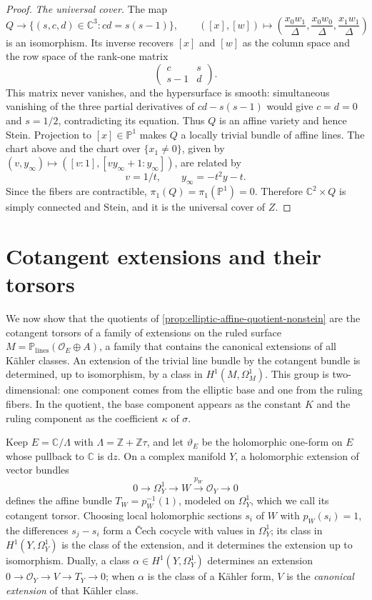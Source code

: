\begin{proof}
\emph{The universal cover.} The map
\[
 Q\longrightarrow\{(s,c,d)\in\mathbb C^3:cd=s(s-1)\},
 \qquad ([x],[w])\longmapsto
 \left(\frac{x_0w_1}{\Delta},\frac{x_0w_0}{\Delta},\frac{x_1w_1}{\Delta}\right)
\]
is an isomorphism. Its inverse recovers $[x]$ and $[w]$ as the column space and the row space of the rank-one matrix
\[
 \begin{pmatrix}c&s\\s-1&d\end{pmatrix}.
\]
This matrix never vanishes, and the hypersurface is smooth: simultaneous vanishing of the three partial derivatives of $cd-s(s-1)$ would give $c=d=0$ and $s=1/2$, contradicting its equation. Thus $Q$ is an affine variety and hence Stein. Projection to $[x]\in\mathbb P^1$ makes $Q$ a locally trivial bundle of affine lines. The chart above and the chart over $\{x_1\ne0\}$, given by $(v,y_\infty)\mapsto([v:1],[vy_\infty+1:y_\infty])$, are related by
\[
 v=1/t,\qquad y_\infty=-t^2y-t.
\]
Since the fibers are contractible, $\pi_1(Q)=\pi_1(\mathbb P^1)=0$. Therefore $\mathbb C^2\times Q$ is simply connected and Stein, and it is the universal cover of $Z$.
\end{proof}

\section{Cotangent extensions and their torsors}
\label{subsec:elliptic-cotangent-torsor-classes}

We now show that the quotients of \cref{prop:elliptic-affine-quotient-nonstein} are the cotangent torsors of a family of extensions on the ruled surface $M=\mathbb P_{\mathrm{lines}}(\mathcal O_E\oplus A)$, a family that contains the canonical extensions of all K\"ahler classes. An extension of the trivial line bundle by the cotangent bundle is determined, up to isomorphism, by a class in $H^1(M,\Omega^1_M)$. This group is two-dimensional: one component comes from the elliptic base and one from the ruling fibers. In the quotient, the base component appears as the constant $K$ and the ruling component as the coefficient $\kappa$ of $\sigma$.

Keep $E=\mathbb C/\Lambda$ with $\Lambda=\mathbb Z+\mathbb Z\tau$, and let $\vartheta_E$ be the holomorphic one-form on $E$ whose pullback to $\mathbb C$ is $\mathrm{d}z$. On a complex manifold $Y$, a holomorphic extension of vector bundles
\[
 0\longrightarrow\Omega_Y^1\longrightarrow W
       \xrightarrow{p_W}\mathcal O_Y\longrightarrow0
\]
defines the affine bundle $T_W=p_W^{-1}(1)$, modeled on $\Omega_Y^1$, which we call its cotangent torsor. Choosing local holomorphic sections $s_i$ of $W$ with $p_W(s_i)=1$, the differences $s_j-s_i$ form a \v{C}ech cocycle with values in $\Omega^1_Y$; its class in $H^1(Y,\Omega_Y^1)$ is the class of the extension, and it determines the extension up to isomorphism. Dually, a class $\alpha\in H^1(Y,\Omega^1_Y)$ determines an extension $0\to\mathcal O_Y\to V\to T_Y\to0$; when $\alpha$ is the class of a K\"ahler form, $V$ is the \emph{canonical extension} of that K\"ahler class.

